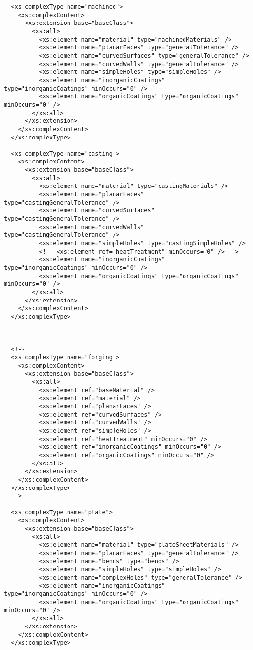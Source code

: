\begin{lstlisting}
  <xs:complexType name="machined">
    <xs:complexContent>
      <xs:extension base="baseClass">
        <xs:all>
          <xs:element name="material" type="machinedMaterials" />
          <xs:element name="planarFaces" type="generalTolerance" />
          <xs:element name="curvedSurfaces" type="generalTolerance" />
          <xs:element name="curvedWalls" type="generalTolerance" />
          <xs:element name="simpleHoles" type="simpleHoles" />
          <xs:element name="inorganicCoatings" type="inorganicCoatings" minOccurs="0" />
          <xs:element name="organicCoatings" type="organicCoatings" minOccurs="0" />
        </xs:all>
      </xs:extension>
    </xs:complexContent>
  </xs:complexType>

  <xs:complexType name="casting">
    <xs:complexContent>
      <xs:extension base="baseClass">
        <xs:all>
          <xs:element name="material" type="castingMaterials" />
          <xs:element name="planarFaces" type="castingGeneralTolerance" />
          <xs:element name="curvedSurfaces" type="castingGeneralTolerance" />
          <xs:element name="curvedWalls" type="castingGeneralTolerance" />
          <xs:element name="simpleHoles" type="castingSimpleHoles" />
          <!-- <xs:element ref="heatTreatment" minOccurs="0" /> -->
          <xs:element name="inorganicCoatings" type="inorganicCoatings" minOccurs="0" />
          <xs:element name="organicCoatings" type="organicCoatings" minOccurs="0" />
        </xs:all>
      </xs:extension>
    </xs:complexContent>
  </xs:complexType>



  <!--
  <xs:complexType name="forging">
    <xs:complexContent>
      <xs:extension base="baseClass">
        <xs:all>
          <xs:element ref="baseMaterial" />
          <xs:element ref="material" />
          <xs:element ref="planarFaces" />
          <xs:element ref="curvedSurfaces" />
          <xs:element ref="curvedWalls" />
          <xs:element ref="simpleHoles" />
          <xs:element ref="heatTreatment" minOccurs="0" />
          <xs:element ref="inorganicCoatings" minOccurs="0" />
          <xs:element ref="organicCoatings" minOccurs="0" />
        </xs:all>
      </xs:extension>
    </xs:complexContent>
  </xs:complexType>
  -->

  <xs:complexType name="plate">
    <xs:complexContent>
      <xs:extension base="baseClass">
        <xs:all>
          <xs:element name="material" type="plateSheetMaterials" />
          <xs:element name="planarFaces" type="generalTolerance" />
          <xs:element name="bends" type="bends" />
          <xs:element name="simpleHoles" type="simpleHoles" />
          <xs:element name="complexHoles" type="generalTolerance" />
          <xs:element name="inorganicCoatings" type="inorganicCoatings" minOccurs="0" />
          <xs:element name="organicCoatings" type="organicCoatings" minOccurs="0" />
        </xs:all>
      </xs:extension>
    </xs:complexContent>
  </xs:complexType>


\end{lstlisting}
